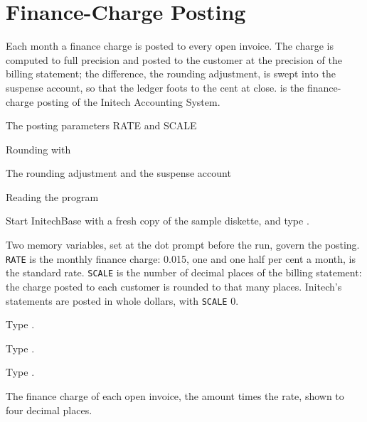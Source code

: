 \chapter{Finance-Charge Posting}
Each month a finance charge is posted to every open invoice.  The charge is
computed to full precision and posted to the customer at the precision of the
billing statement; the difference, the rounding adjustment, is swept into the
suspense account, so that the ledger foots to the cent at close.
 is the finance-charge posting of the Initech Accounting
System.

\begin{ChapterCovers}
\item The posting parameters RATE and SCALE
\item Rounding with 
\item The rounding adjustment and the suspense account
\item Reading the program
\end{ChapterCovers}

Start InitechBase with a fresh copy of the sample diskette, and type
.

Two memory variables, set at the dot prompt before the run, govern the posting.
\texttt{RATE} is the monthly finance charge: 0.015, one and one half per cent a
month, is the standard rate.  \texttt{SCALE} is the number of decimal places of
the billing statement: the charge posted to each customer is rounded to that
many places.  Initech's statements are posted in whole dollars, with
\texttt{SCALE} 0.

\begin{Steps}
\item Type .
\item Type .
\item Type .
\end{Steps}
The finance charge of each open invoice, the amount times the
rate, shown to four decimal places.

